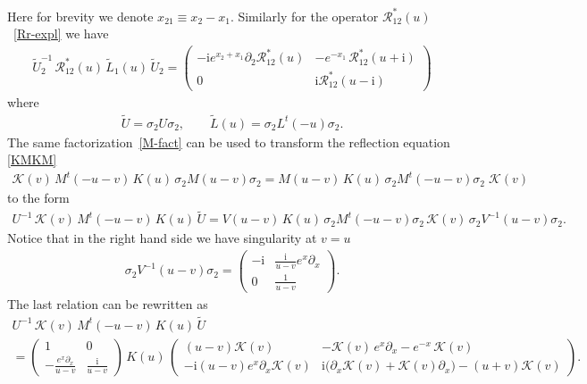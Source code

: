 \documentclass[11pt]{article}
\numberwithin{equation}{section}
\theoremstyle{plain}
\theoremstyle{definition}
\renewcommand{\imath}{\mathrm{i}}
\begin{document}
Here for brevity we denote $x_{21} \equiv x_2 - x_1$.
Similarly for the operator $\mathcal{R}^*_{12}(u)$~\eqref{Rr-expl} we have
\begin{align}\label{Bax2}
\widetilde{U}^{-1}_2 \,\mathcal{R}^*_{12}(u) \, 
\widetilde{L}_1(u) \, \widetilde{U}_2 = 
\begin{pmatrix}
-\imath e^{x_{2}+x_{1}}\partial_2 \mathcal{R}^*_{12}(u) & -e^{-x_1}\,\mathcal{R}^*_{12}(u+\imath) \\[6pt]
0 & \imath \mathcal{R}^*_{12}(u-\imath)
	\end{pmatrix}
\end{align}
where 
\begin{align}
\widetilde{U} = \sigma_2 U \sigma_2, \qquad \widetilde{L}(u) = \sigma_2 L^t(-u) \sigma_2.
\end{align}
The same factorization~\eqref{M-fact} can be used to transform the 
reflection equation \eqref{KMKM}
\begin{align}
\mathcal{K}(v) \, M^t(-u-v) \, K(u) \, \sigma_2 M(u - v) \sigma_2
= M(u - v) \, K(u) \, \sigma_2 M^t(-u -v) \sigma_2 \; \mathcal{K}(v)
\end{align}
to the form
\begin{align}
U^{-1}\,\mathcal{K}(v) \, M^t(-u-v) \, K(u) \,\widetilde{U} = V(u - v) \, K(u) \, \sigma_2 M^t(-u -v) \sigma_2 \, \mathcal{K}(v) \, \sigma_2 V^{-1}(u-v) \sigma_2.
\end{align}
Notice that in the right hand side we have singularity at $v = u$
\begin{align}
\sigma_2 V^{-1}(u - v) \sigma_2 =  
\begin{pmatrix}
-\imath & \frac{\imath}{u - v} e^x\partial_x \\[6pt]
0 & \frac{1}{u - v}
\end{pmatrix} .
\end{align}
The last relation can be rewritten as
\begin{multline}
U^{-1}\,\mathcal{K}(v) \, M^t(-u-v) \, K(u) \,\widetilde{U} \\[6pt]
= \begin{pmatrix}
1 & 0 \\[6pt]
-\frac{e^{x}\partial_x}{u-v} & \frac{\imath}{u-v}
\end{pmatrix} \, K(u) \, 
\begin{pmatrix}
(u-v)\mathcal{K}(v) & -\mathcal{K}(v)\,e^{x}\partial_x - e^{-x}\,\mathcal{K}(v) \\[6pt]
-\imath (u-v)e^{x}\partial_x \mathcal{K}(v) & 
\imath \bigl(\partial_x\mathcal{K}(v)+\mathcal{K}(v)\partial_x \bigr) - (u+v)\mathcal{K}(v)
\end{pmatrix}.
\end{multline}
\end{document}

